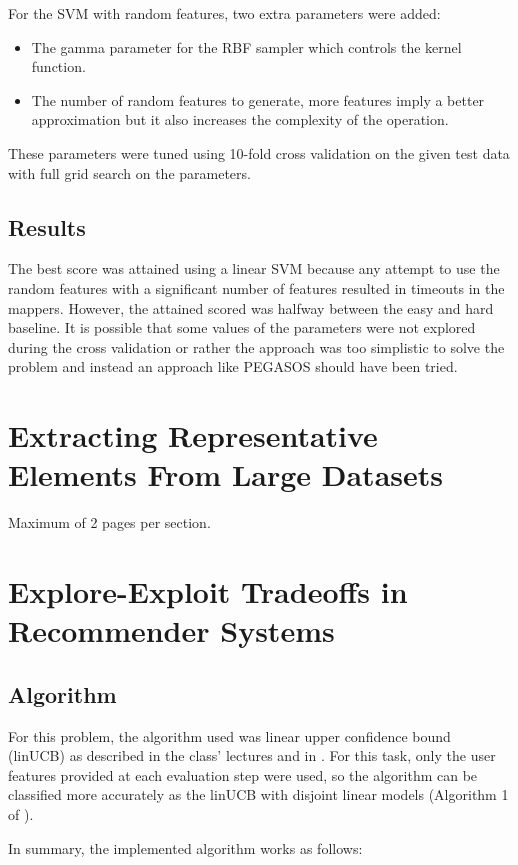 \documentclass[a4paper, 11pt]{article}
\begin{document}
For the SVM with random features, two extra parameters were added:
\begin{itemize}
	\item The gamma parameter for the RBF sampler which controls the kernel function.
	\item The number of random features to generate, more features imply a better approximation but it also increases the complexity of the operation.
\end{itemize}

These parameters were tuned using 10-fold cross validation on the given test data with full grid search on the parameters.

\subsection{Results}

The best score was attained using a linear SVM because any attempt to use the random features with a significant number of features resulted in timeouts in the mappers. However, the attained scored was halfway between the easy and hard baseline. It is possible that some values of the parameters were not explored during the cross validation or rather the approach was too simplistic to solve the problem and instead an approach like PEGASOS should have been tried.

\clearpage
\section{Extracting Representative Elements From Large Datasets}
Maximum of 2 pages per section.

\clearpage
\section{Explore-Exploit Tradeoffs in Recommender Systems}

\subsection{Algorithm}
For this problem, the algorithm used was linear upper confidence bound (linUCB) as described in the class' lectures and in \cite{li2010contextual}. For this task, only the user features provided at each evaluation step were used, so the algorithm can be classified more accurately as the linUCB with disjoint linear models (Algorithm 1 of  \cite{li2010contextual}).

In summary, the implemented algorithm works as follows:
\end{document}
